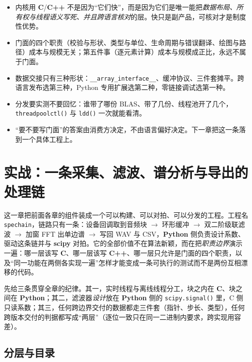 \documentclass[12pt,a4paper,fontset=fandol]{ctexbook}
\newcommand{\Fn}[1]{\texttt{#1()}}
\newcommand{\Tp}[1]{\texttt{#1}}
\newcommand{\Bk}{\allowbreak}
\newcommand{\Lib}[1]{\textbf{#1}}
\newcommand{\Lang}[1]{\textsf{\bfseries #1}}
\newcommand{\CL}{\Lang{C}}
\newcommand{\CPP}{\Lang{C++}}
\newcommand{\PY}{\Lang{Python}}
\begin{document}
\begin{guideline}[title={全书主线，收束成一则判据}]
\begin{itemize}
\item 内核用 \CL/{\Bk}\CPP{} 不是因为``它们快''，而是因为它们是唯一能把\emph{数据布局、所有权与线程语义写死、并且跨语言核对}的层。快只是副产品，可核对才是制度性优势。
\item 门面的四个职责（校验与形状、类型与单位、生命周期与错误翻译、绘图与路径）成本与规模无关；第五件事（逐元素计算）成本与规模成正比，永远不属于门面。
\item 数据交接只有三种形状：\Tp{\_\_array\_interface\Bk\_\_}、缓冲协议、三件套摊平。跨语言发布选第三种，Python 专用扩展选第二种，零链接调试选第一种。
\item 分发要实测不要回忆：谁带了哪份 BLAS、带了几份、线程池开了几个，\Fn{threadpoolctl} 与 \Fn{ldd} 一次就能看清。
\item ``要不要写门面''的答案由消费方决定，不由语言偏好决定。下一章把这一条落到一个具体工程上。
\end{itemize}
\end{guideline}

\chapter{实战：一条采集、滤波、谱分析与导出的处理链}

这一章把前面各章的组件装成一个可以构建、可以对拍、可以分发的工程。工程名 \Tp{spechain}，链路只有一条：设备回调取到音频块 $\to$ 环形缓冲 $\to$ 双二阶级联滤波 $\to$ 加窗 FFT 出单边谱 $\to$ 写回 WAV 与 CSV，\PY{} 侧负责设计系数、驱动这条链并与 \Lib{scipy} 对拍。它的全部价值不在算法新颖，而在把\emph{职责边界}演示一遍：哪一层该写 \CL、哪一层该写 \CPP、哪一层只允许是门面的四个职责，以及``同一功能在两侧各实现一遍''怎样才能变成一条可执行的测试而不是两份互相漂移的代码。

先给三条贯穿全章的纪律。其一，实时线程与离线线程分工，块之内在 \CL、块之间在 \PY{}；其二，滤波器\emph{设计}放在 \PY{} 侧的 \Fn{scipy.signal} 里，C 侧只读系数；其三，任何跨边界交付的数据都走三件套（指针、步长、类型），任何跨版本交付的判据都写成``两层''（逐位一致只在同一二进制内要求，跨实现用容差）。

\section{分层与目录}
\end{document}
